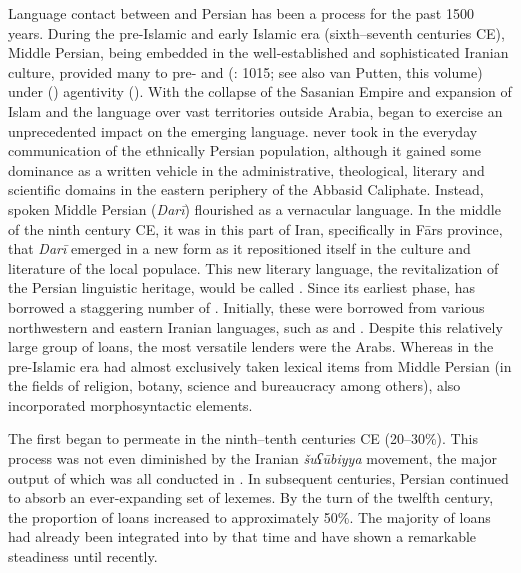 \documentclass[output=paper]{langsci/langscibook}
\begin{document}
Language contact between  and Persian has been a  process for the past 1500 years. During the pre-Islamic and early Islamic era (sixth–seventh centuries CE), Middle Persian, being embedded in the well-established and sophisticated Iranian culture, provided many  to pre- and   (\citealt{Gazsi2011}: 1015; see also van Putten, this volume) under  () agentivity (\citealt{VanCoetsem1988,VanCoetsem2000}). With the collapse of the Sasanian Empire and expansion of Islam and the  language over vast territories outside Arabia,   began to exercise an unprecedented impact on the emerging  language.  never took  in the everyday communication of the ethnically Persian population, although it gained some dominance as a written vehicle in the administrative, theological, literary and scientific domains in the eastern periphery of the Abbasid Caliphate. Instead, spoken Middle Persian (\textit{Darī}) flourished as a vernacular language. In the middle of the ninth century CE, it was in this part of Iran, specifically in Fārs province, that \textit{Darī} emerged in a new form as it repositioned itself in the culture and literature of the local populace. This new literary language, the revitalization of the Persian linguistic heritage, would be called . Since its earliest phase,  has borrowed a staggering number of . Initially, these  were borrowed from various northwestern and eastern Iranian languages, such as  and . Despite this relatively large group of loans, the most versatile lenders were the Arabs. Whereas in the pre-Islamic era  had almost exclusively taken lexical items from Middle Persian (in the fields of religion, botany, science and bureaucracy among others),  also incorporated  morphosyntactic elements.

The first   began to permeate  in the ninth–tenth centuries CE (20–30\%). This process was not even diminished by the Iranian \textit{šuʕūbiyya} movement, the major output of which was all conducted in . In subsequent centuries, Persian continued to absorb an ever-expanding set of  lexemes. By the turn of the twelfth century, the proportion of  loans increased to approximately 50\%. The majority of  loans had already been integrated into  by that time and have shown a remarkable steadiness until recently.
\end{document}
